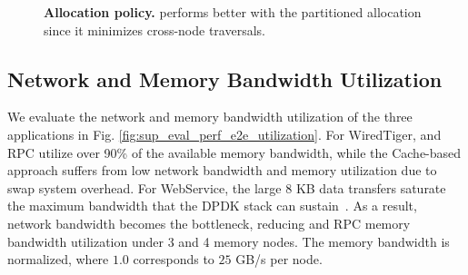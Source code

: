 \begin{figure}[b]
\centering
  \vspace{-0.2em}
  \caption[Allocation policy]{\textbf{Allocation policy.} \pulse performs better with the partitioned allocation since it minimizes cross-node traversals.}
\end{figure}


\subsection{Network and Memory Bandwidth Utilization} 
We evaluate the network and memory bandwidth utilization of the three applications in Fig. \ref{fig:sup_eval_perf_e2e_utilization}. For WiredTiger, \pulse and RPC utilize over 90\% of the available memory bandwidth, while the Cache-based approach suffers from low network bandwidth and memory utilization due to swap system overhead. For WebService, the large 8 KB data transfers saturate the maximum bandwidth that the DPDK stack can sustain~\cite{erpc}. As a result, network bandwidth becomes the bottleneck, reducing \pulse and RPC memory bandwidth utilization under 3 and 4 memory nodes. The memory bandwidth is normalized, where $1.0$ corresponds to $25$ GB/s per node.



